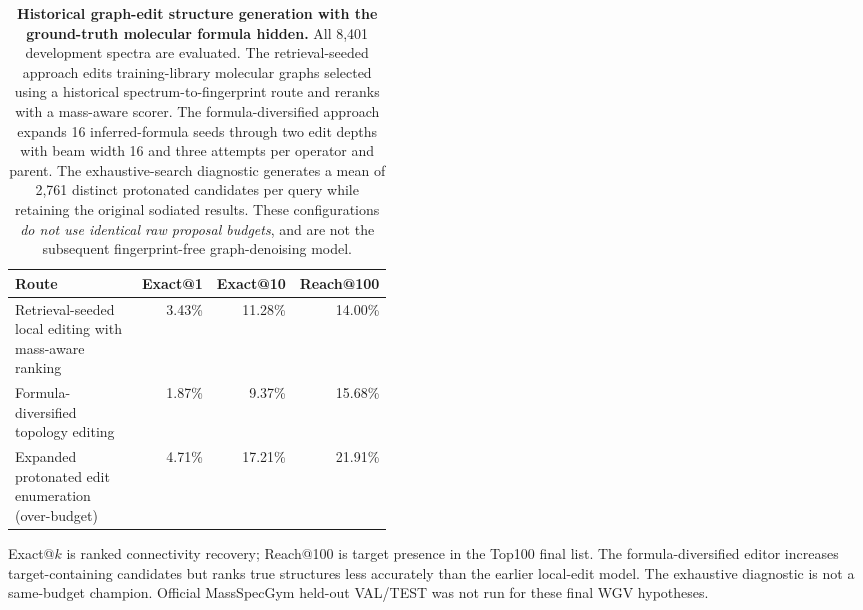 \begin{table}[!htbp]
\centering
\caption{\textbf{Historical graph-edit structure generation with the ground-truth molecular formula hidden.} All 8,401 development spectra are evaluated. The retrieval-seeded approach edits training-library molecular graphs selected using a historical spectrum-to-fingerprint route and reranks with a mass-aware scorer. The formula-diversified approach expands 16 inferred-formula seeds through two edit depths with beam width 16 and three attempts per operator and parent. The exhaustive-search diagnostic generates a mean of 2,761 distinct protonated candidates per query while retaining the original sodiated results. These configurations \emph{do not use identical raw proposal budgets}, and are not the subsequent fingerprint-free graph-denoising model.}
\label{tab:msdev_denovo}
\small
\setlength{\tabcolsep}{4pt}
\begin{tabular}{p{0.44\linewidth}rrr}
\toprule
Route & Exact@1 & Exact@10 & Reach@100 \\
\midrule
Retrieval-seeded local editing with mass-aware ranking & 3.43\% & 11.28\% & 14.00\% \\
Formula-diversified topology editing & 1.87\% & 9.37\% & 15.68\% \\
Expanded protonated edit enumeration (over-budget) & 4.71\% & 17.21\% & 21.91\% \\
\bottomrule
\end{tabular}
\vspace{3pt}
\begin{minipage}{0.97\linewidth}\footnotesize
Exact@$k$ is ranked connectivity recovery; Reach@100 is target presence in the Top100 final list. The formula-diversified editor increases target-containing candidates but ranks true structures less accurately than the earlier local-edit model. The exhaustive diagnostic is not a same-budget champion. Official MassSpecGym held-out VAL/TEST was not run for these final WGV hypotheses.
\end{minipage}
\end{table}

